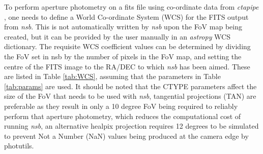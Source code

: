 To perform aperture photometry on a fits file using co-ordinate data from \textit{ctapipe} \cite{ctapipe2}, one needs to define a World Co-ordinate System (WCS) for the FITS output from \textit{nsb}. This is not automatically written by \textit{nsb} upon the FoV map being created, but it can be provided by the user manually in an \textit{astropy} WCS dictionary. The requisite WCS coefficient values can be determined by dividing the FoV set in nsb by the number of pixels in the FoV map, and setting the centre of the FITS image to the RA/DEC to which \textit{nsb} has been aimed. These are listed in Table \ref{tab:WCS}, assuming that the parameters in Table \ref{tab:params} are used. It should be noted that the CTYPE parameters affect the size of the FoV that needs to be used with \textit{nsb}, tangential projections (TAN) are preferable as they result in only a 10 degree FoV being required to reliably perform that aperture photometry, which reduces the computational cost of running \textit{nsb}, an alternative healpix projection requires 12 degrees to be simulated to prevent Not a Number (NaN) values being produced at the camera edge by photutils.
\begin{table}[]
    \centering
    \caption{WCS Dictionary Headers and Parameters Recommended for SSTCAM, Reliant on Configuration in Table \ref{tab:params}. Note the CTYPEn projection used affects the nessecary size of the FoV map generated by \textit{nsb}. The rotation parameters CROTA1 and CROTA2 are degenerate in their effect, and are not trivially set.}
    \label{tab:WCS}
\end{table}

